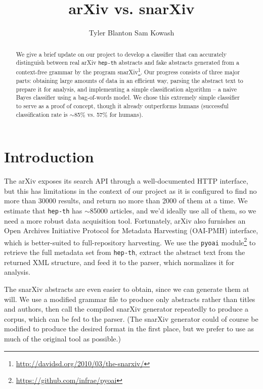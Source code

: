 \documentclass{article}
\title{arXiv vs. snarXiv}
\author{Tyler Blanton \And Sam Kowash}
\begin{document}

\maketitle

\begin{abstract}
  We give a brief update on our project to develop a classifier that can accurately distinguish between real arXiv \texttt{hep-th} abstracts and fake abstracts generated from a context-free grammar by the program snarXiv\footnote{\url{http://davidsd.org/2010/03/the-snarxiv/}}.
  Our progress consists of three major parts: obtaining large amounts of data in an efficient way, parsing the abstract text to prepare it for analysis, and implementing a simple classification algorithm -- a naive Bayes classifier using a bag-of-words model.
  We chose this extremely simple classifier to serve as a proof of concept, though it already outperforms humans (successful classification rate is $\sim$85\% vs. 57\% for humans).
\end{abstract}




\section{Introduction} \label{sec:intro}
The arXiv exposes its search API through a well-documented HTTP interface, but this has limitations in the context of our project as it is configured to find no more than 30000 results, and return no more than 2000 of them at a time.
We estimate that \texttt{hep-th} has $\sim$85000 articles, and we'd ideally use all of them, so we need a more robust data acquisition tool.
Fortunately, arXiv also furnishes an Open Archives Initiative Protocol for Metadata Harvesting (OAI-PMH) interface, which is better-suited to full-repository harvesting. We use the \texttt{pyoai} module\footnote{\url{https://github.com/infrae/pyoai}} to retrieve the full metadata set from \texttt{hep-th}, extract the abstract text from the returned XML structure, and feed it to the parser, which normalizes it for analysis.

The snarXiv abstracts are even easier to obtain, since we can generate them at will.
We use a modified grammar file to produce only abstracts rather than titles and authors, then call the compiled snarXiv generator repeatedly to produce a corpus, which can be fed to the parser.
(The snarXiv generator could of course be modified to produce the desired format in the first place, but we prefer to use as much of the original tool as possible.)
\end{document}
